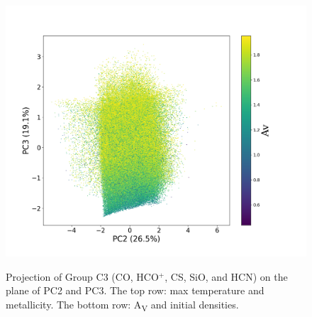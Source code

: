 \documentclass{aa}
\begin{document}
\begin{CJK*}{UTF8}{gbsn}
\begin{figure}[htbp]
{        \label{C3-23-av}
        \includegraphics[scale = 0.27]{5/PC2&3_av.png}
        }
        \caption{Projection of Group C3 (CO, HCO$^+$, CS, SiO, and HCN) on the plane of PC2 and PC3. The top row: max temperature and metallicity. The bottom row: A\textsubscript{V} and initial densities.}
        \label{C3-23}
    \end{figure}


\end{CJK*}
\end{document}

